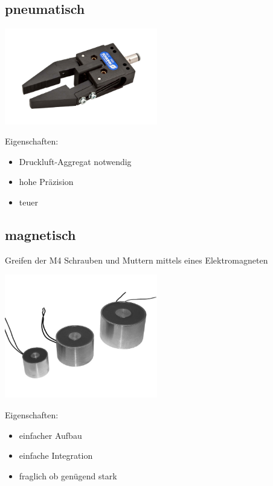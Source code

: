 \subsection{pneumatisch}
\includegraphics[width=0.5\textwidth]{Images/pneumatGr_schunk.jpg}

Eigenschaften: 
\begin{itemize}
\item Druckluft-Aggregat notwendig
\item hohe Präzision
\item teuer
\end{itemize}

\subsection{magnetisch}
Greifen der M4 Schrauben und Muttern mittels eines Elektromagneten

\includegraphics[width=0.5\textwidth]{Images/Magnetgreifer.png}

Eigenschaften:
\begin{itemize}
\item einfacher Aufbau
\item einfache Integration
\item fraglich ob genügend stark
\end{itemize}